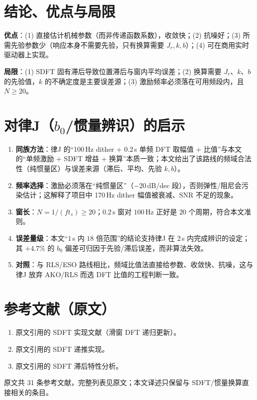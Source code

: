 \documentclass[UTF8,a4paper,11pt]{ctexart}
\begin{document}
\section{结论、优点与局限}
\textbf{优点}：(1) 直接估计机械参数（而非传递函数系数），收敛快；(2) 抗噪好；(3) 所需先验参数少（响应本身不需要先验，只有换算需要 $J_r,k,b$）；(4) 可在商用实时驱动器上实现。

\textbf{局限}：(1) SDFT 固有滞后导致位置滞后与窗内平均误差；(2) 换算需要 $J_r$、$k$、$b$ 的先验值，$k$ 的不确定度是主要误差源；(3) 激励频率必须落在可用频段内，且 $N\ge20$。

\section{对律J（$b_0$/惯量辨识）的启示}
\begin{enumerate}
  \item \textbf{同族方法}：律J 的“100\,Hz dither + 0.2\,s 单频 DFT 取幅值 + 比值”与本文的“单频激励 + SDFT 增益 + 换算”本质一致；本文给出了该路线的频域合法性（纯惯量区）与误差来源（滞后、平均、先验 $k,b$）。
  \item \textbf{频率选择}：激励必须落在“纯惯量区”（$-20$\,dB/dec 段），否则弹性/阻尼会污染估计；这解释了项目中 170\,Hz dither 幅值被衰减、SNR 不足的现象。
  \item \textbf{窗长}：$N=1/(ft_s)\ge20$；$0.2$\,s 窗对 $100$\,Hz 正好是 $20$ 个周期，符合本文准则。
  \item \textbf{误差量级}：本文“$1$\,s 内 $18$ 倍范围”的结论支持律J 在 $2$\,s 内完成辨识的设定；其 $+4.7\%$ 的 $b_0$ 偏差可归因于先验/滞后误差，而非算法失效。
  \item \textbf{对照}：与 RLS/ESO 路线相比，频域比值法直接给参数、收敛快、抗噪，这与律J 放弃 AKO/RLS 而选 DFT 比值的工程判断一致。
\end{enumerate}

\section*{参考文献（原文）}
\begin{enumerate}
  \item[{[21]}] 原文引用的 SDFT 实现文献（滑窗 DFT 递归更新）。
  \item[{[22]}] 原文引用的 SDFT 递推实现。
  \item[{[23]}] 原文引用的 SDFT 滞后特性分析。
\end{enumerate}
\noindent\footnotesize 原文共 31 条参考文献，完整列表见原文；本文译述只保留与 SDFT/惯量换算直接相关的条目。
\end{document}
